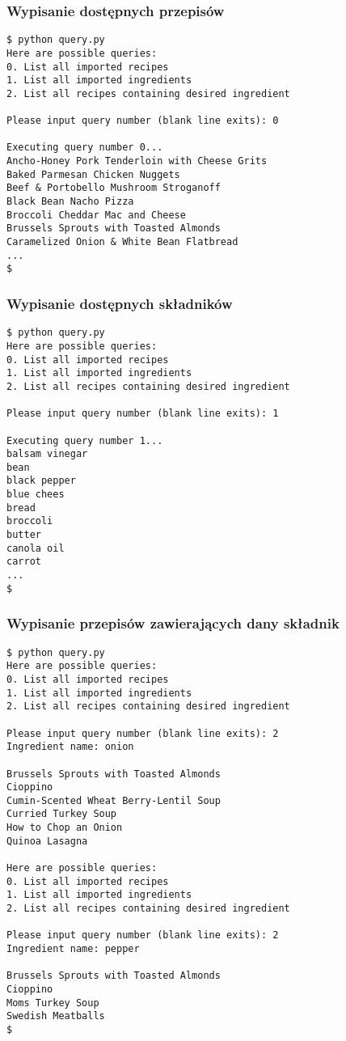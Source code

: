 \documentclass[11pt,a4paper]{article}
\begin{document}
\subsubsection{Wypisanie dostępnych przepisów}
\begin{lstlisting}
$ python query.py
Here are possible queries:
0. List all imported recipes
1. List all imported ingredients
2. List all recipes containing desired ingredient

Please input query number (blank line exits): 0

Executing query number 0...
Ancho-Honey Pork Tenderloin with Cheese Grits
Baked Parmesan Chicken Nuggets
Beef & Portobello Mushroom Stroganoff
Black Bean Nacho Pizza
Broccoli Cheddar Mac and Cheese
Brussels Sprouts with Toasted Almonds
Caramelized Onion & White Bean Flatbread
...
$
\end{lstlisting}

\subsubsection{Wypisanie dostępnych składników}
\begin{lstlisting}
$ python query.py
Here are possible queries:
0. List all imported recipes
1. List all imported ingredients
2. List all recipes containing desired ingredient

Please input query number (blank line exits): 1

Executing query number 1...
balsam vinegar
bean
black pepper
blue chees
bread
broccoli
butter
canola oil
carrot
...
$
\end{lstlisting}

\subsubsection{Wypisanie przepisów zawierających dany składnik}
\begin{lstlisting}
$ python query.py
Here are possible queries:
0. List all imported recipes
1. List all imported ingredients
2. List all recipes containing desired ingredient

Please input query number (blank line exits): 2    
Ingredient name: onion

Brussels Sprouts with Toasted Almonds
Cioppino
Cumin-Scented Wheat Berry-Lentil Soup
Curried Turkey Soup
How to Chop an Onion
Quinoa Lasagna

Here are possible queries:
0. List all imported recipes
1. List all imported ingredients
2. List all recipes containing desired ingredient

Please input query number (blank line exits): 2
Ingredient name: pepper

Brussels Sprouts with Toasted Almonds
Cioppino
Moms Turkey Soup
Swedish Meatballs
$
\end{lstlisting}
\end{document}
